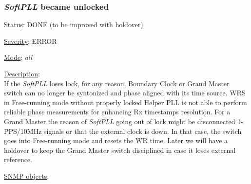\subsubsection{\bf \emph{SoftPLL} became unlocked}
		\label{fail:timing:spll_unlock}
		\begin{pck_descr}
      \item [] \underline{Status}: DONE (to be improved with holdover)
			\item [] \underline{Severity}: ERROR
			\item [] \underline{Mode}: \emph{all}
			\item [] \underline{Description}:\\
				If the \emph{SoftPLL} loses lock, for any reason, Boundary Clock or
        Grand Master switch can no longer be syntonized and phase aligned with
        its time source. WRS in Free-running mode without properly locked Helper
        PLL is not able to perform reliable phase measurements for enhancing Rx
				timestamps resolution. For a Grand Master the reason of \emph{SoftPLL}
				going out of lock might be disconnected 1-PPS/10MHz signals or that the
        external clock is down. In that case, the switch goes into Free-running
        mode and resets the WR time. Later we will have a holdover to keep the
        Grand Master switch disciplined in case it loses external reference.
			\item [] \underline{SNMP objects}:\\
        {\footnotesize
				\\
				\\
				\\
				\\
				\\
				\\
				\\
				 \\
         }
		\end{pck_descr}

